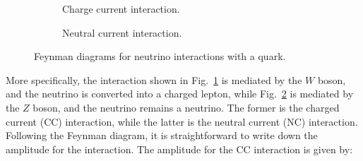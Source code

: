 \begin{figure}[h]
  \centering
  \begin{subfigure}[b]{0.45\textwidth}
    \centering
    \caption{Charge current interaction.}
    \label{fig:cc-interaction}
  \end{subfigure}
  \hfill
  \begin{subfigure}[b]{0.45\textwidth}
    \centering
    \caption{Neutral current interaction.}
    \label{fig:nc-interaction}
  \end{subfigure}
  \caption{Feynman diagrams for neutrino interactions with a quark.}
  \label{fig:nu-q-feyn}
\end{figure}
More specifically, the interaction shown in Fig.~\ref{fig:cc-interaction} is mediated by the $W$ boson, and the neutrino is converted into a charged lepton, while Fig.~\ref{fig:nc-interaction} is mediated by the $Z$ boson, and the neutrino remains a neutrino.
The former is the charged current (CC) interaction, while the latter is the neutral current (NC) interaction.
Following the Feynman diagram, it is straightforward to write down the amplitude for the interaction.
The amplitude for the CC interaction is given by:
